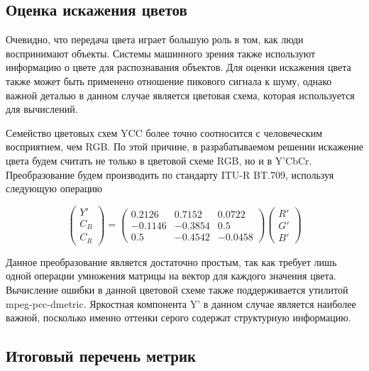 \subsection{Оценка искажения цветов}


Очевидно, что передача цвета играет большую роль в том, как люди воспринимают
объекты. Системы машинного зрения также используют информацию о цвете для
распознавания объектов\cite{SelfDriving}. Для оценки искажения цвета также может
быть применено отношение пикового сигнала к шуму, однако важной деталью в данном
случае является цветовая схема, которая используется для вычислений.

Семейство цветовых схем YCC более точно соотносится с человеческим восприятием,
чем RGB\cite[291]{Poynton2001-sf}. По этой причине, в разрабатываемом решении
искажение цвета будем считать не только в цветовой схеме RGB, но и в Y'CbCr.
Преобразование будем производить по стандарту ITU-R BT.709, используя следующую
операцию

\begin{equation} \label{eq:itu_ycc}
    \begin{pmatrix}
        Y' \\
        C_{B} \\
        C_{R}
    \end{pmatrix} = \begin{pmatrix}
        0.2126 & 0.7152 & 0.0722 \\
        -0.1146 & -0.3854 & 0.5 \\
        0.5 & -0.4542 & -0.0458
    \end{pmatrix} \begin{pmatrix}
        R' \\
        G' \\
        B'
    \end{pmatrix}
\end{equation}

Данное преобразование является достаточно простым, так как требует лишь одной
операции умножения матрицы на вектор для каждого значения цвета. Вычисление
ошибки в данной цветовой схеме также поддерживается утилитой mpeg-pcc-dmetric.
Яркостная компонента Y' в данном случае является наиболее важной, посколько
именно оттенки серого содержат структурную информацию.

\subsection{Итоговый перечень метрик}

